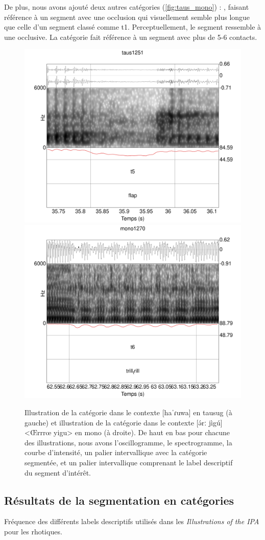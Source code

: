 De plus, nous avons ajouté deux autres catégories (\autoref{fig:taus_mono}) : , faisant référence à un segment avec une occlusion qui visuellement semble plus longue que celle d'un segment classé comme t1. Perceptuellement, le segment ressemble à une occlusive. La catégorie  fait référence à un segment avec plus de 5-6 contacts.\\

\begin{figure}
	\centering
	\includegraphics[width=0.45\linewidth]{substance/spectro_images/taus1251_1657_10}
	\includegraphics[width=0.45\linewidth]{substance/spectro_images/mono1270_1188_12}
	\caption[Illustrations des catégories  et ]{Illustration de la catégorie  dans le contexte [haˈɾuwa] en tausug (à gauche) et illustration de la catégorie  dans le contexte [ə́rː jìgú] <Œrrrœ yigu> en mono (à droite). De haut en bas pour chacune des illustrations, nous avons l'oscillogramme, le spectrogramme, la courbe d'intensité, un palier intervallique avec la catégorie segmentée, et un palier intervallique comprenant le label descriptif du segment d'intérêt.}
	\label{fig:taus_mono}
\end{figure}

\subsection{Résultats de la segmentation en catégories}

\begin{table}
	\centering
	
	\caption[Fréquence des différents labels descriptifs utilisés dans les \textit{Illustrations of the IPA} pour les rhotiques]{Fréquence des différents labels descriptifs utilisés dans les \textit{Illustrations of the IPA} pour les rhotiques.}
	\label{tab:table_descLabel}
\end{table}

